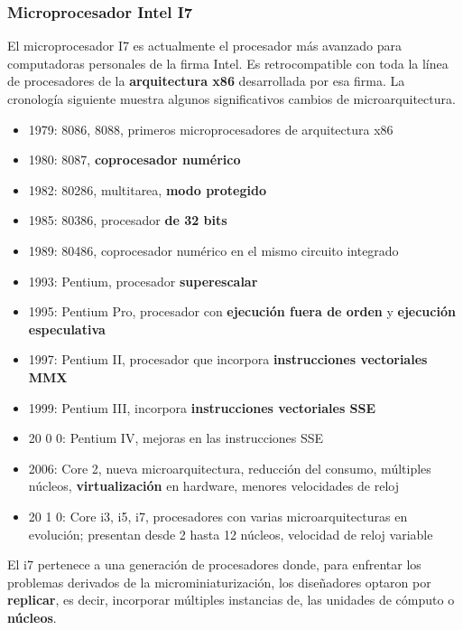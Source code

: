 \documentclass[spanish,A4,]{article}
\begin{document}
\subsubsection{Microprocesador Intel I7}\label{microprocesador-intel-i7}

El microprocesador I7 es actualmente el procesador más avanzado para
computadoras personales de la firma Intel. Es retrocompatible con toda
la línea de procesadores de la \textbf{arquitectura x86} desarrollada
por esa firma. La cronología siguiente muestra algunos significativos
cambios de microarquitectura.

\begin{itemize}
\itemsep1pt\parskip0pt
\item
  1979: 8086, 8088, primeros microprocesadores de arquitectura x86
\item
  1980: 8087, \textbf{coprocesador numérico}
\item
  1982: 80286, multitarea, \textbf{modo protegido}
\item
  1985: 80386, procesador \textbf{de 32 bits}
\item
  1989: 80486, coprocesador numérico en el mismo circuito integrado
\item
  1993: Pentium, procesador \textbf{superescalar}
\item
  1995: Pentium Pro, procesador con \textbf{ejecución fuera de orden} y
  \textbf{ejecución especulativa}
\item
  1997: Pentium II, procesador que incorpora \textbf{instrucciones
  vectoriales MMX}
\item
  1999: Pentium III, incorpora \textbf{instrucciones vectoriales SSE}
\item
  20 0 0: Pentium IV, mejoras en las instrucciones SSE
\item
  2006: Core 2, nueva microarquitectura, reducción del consumo,
  múltiples núcleos, \textbf{virtualización} en hardware, menores
  velocidades de reloj
\item
  20 1 0: Core i3, i5, i7, procesadores con varias microarquitecturas en
  evolución; presentan desde 2 hasta 12 núcleos, velocidad de reloj
  variable
\end{itemize}

El i7 pertenece a una generación de procesadores donde, para enfrentar
los problemas derivados de la microminiaturización, los diseñadores
optaron por \textbf{replicar}, es decir, incorporar múltiples instancias
de, las unidades de cómputo o \textbf{núcleos}.
\end{document}
